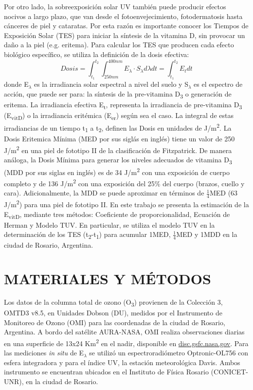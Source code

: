 \documentclass[10pt,twocolumn]{article}
\begin{document}
Por otro lado, la sobreexposición solar UV también puede producir efectos nocivos a largo plazo, que van desde el fotoenvejecimiento, fotodermatosis hasta cánceres de piel y cataratas.\cite{Gilaberte2011,Modenese2016} Por esta razón es importante conocer los Tiempos de Exposición Solar (TES) para iniciar la síntesis de la vitamina D, sin provocar un daño a la piel (e.g. eritema). Para calcular los TES que producen cada efecto biológico específico, se utiliza la definición de la dosis efectiva:
\begin{equation}
  Dosis=\int_{t_1}^{t_2} \int_{250nm}^{400nm} E_\lambda\cdot S_\lambda d\lambda dt = \int_{t_1}^{t_2}E_tdt \label{eq:dosis}
\end{equation}
donde E$_\lambda$ es la irradiancia solar espectral a nivel del suelo y S$_\lambda$ es el espectro de acción, que puede ser para: la síntesis de la pre-vitamina D\textsubscript{3} o generación de eritema. La irradiancia efectiva E\textsubscript{t}, representa la irradiancia de pre-vitamina D\textsubscript{3} (E\textsubscript{vitD}) o la irradiancia eritémica (E\textsubscript{er}) según sea el caso. La integral de estas irradiancias de un tiempo t\textsubscript{1} a t\textsubscript{2}, definen las Dosis en unidades de J/m\textsuperscript{2}.
La Dosis Eritemica Mínima (MED por sus siglás en inglés) tiene un valor de 250 J/m\textsuperscript{2} en una piel de fototipo II de la clasificación de Fitzpatrick.\cite{Fitzpatrick1988} De manera análoga, la Dosis Mínima para generar los niveles adecuados de vitamina D\textsubscript{3} (MDD por sus siglas en inglés) es de 34 J/m\textsuperscript{2} con una exposición de cuerpo completo y de 136 J/m\textsuperscript{2} con una exposición del 25\% del cuerpo (brazos, cuello y cara).\cite{UVDoses, Fioletov_2010} Adicionalmente, la MDD se puede aproximar en términos de $\frac{1}{4}$MED (63 J/m\textsuperscript{2}) para una piel de fototipo II\cite{Dowdy_2010}. En este trabajo se presenta la estimación de la E\textsubscript{vitD}, mediante tres métodos: Coeficiente de proporcionalidad,\cite{UVDoses} Ecuación de Herman\cite{Herman2010} y Modelo TUV.\cite{Madronich1987} En particular, se utiliza el modelo TUV en la determinación de los TES (t\textsubscript{2}-t\textsubscript{1}) para acumular 1MED, $\frac{1}{4}$MED y 1MDD en la ciudad de Rosario, Argentina.

\section{MATERIALES Y MÉTODOS}
Los datos de la columna total de ozono (O\textsubscript{3}) provienen de la Colección 3, OMTD3 v8.5, en Unidades Dobson (DU), medidos por el Instrumento de Monitoreo de Ozono (OMI) para las coordenadas de la ciudad de Rosario, Argentina. A bordo del satélite AURA-NASA, OMI realiza observaciones diarias en una superficie de 13x24 Km\textsuperscript{2} en el nadir, disponible en \href{(disc.gsfc.nasa.gov)}{\url{disc.gsfc.nasa.gov}}. Para las mediciones \emph{in situ} de E$_\lambda$ se utilizó un espectroradiómetro Optronic-OL756 con esfera integradora y para el índice UV, la estación meteorológica Davis. Ambos instrumento se encuentran ubicados en el Instituto de Física Rosario (CONICET-UNR), en la ciudad de Rosario.
\end{document}
